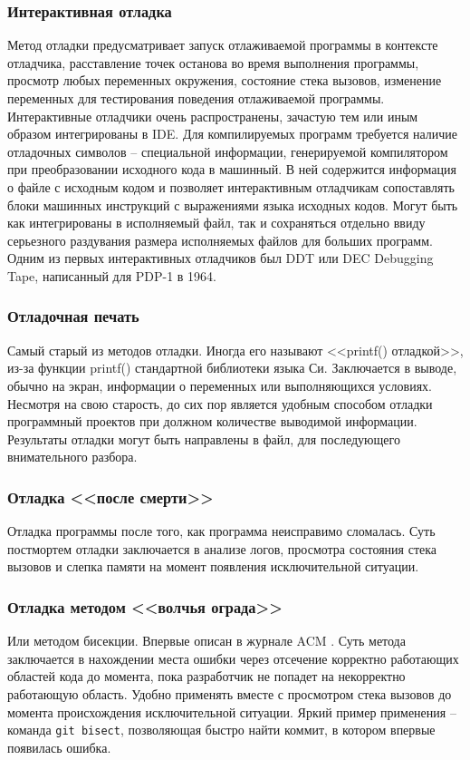 \subsubsection{Интерактивная отладка}\label{sec:ch2/sec1/sub3/sub1}
Метод отладки предусматривает запуск отлаживаемой программы в контексте
отладчика, расставление точек останова во время выполнения программы, просмотр
любых переменных окружения, состояние стека вызовов, изменение переменных
для тестирования поведения отлаживаемой программы.
Интерактивные отладчики очень распространены, зачастую тем или иным образом
интегрированы в IDE. Для компилируемых программ требуется наличие отладочных
символов -- специальной информации, генерируемой компилятором при 
преобразовании исходного кода в машинный. В ней содержится информация о 
файле с исходным кодом и позволяет интерактивным отладчикам сопоставлять
блоки машинных инструкций с выражениями языка исходных кодов. Могут
быть как интегрированы в исполняемый файл, так и сохраняться отдельно ввиду
серьезного раздувания размера исполняемых файлов для больших программ.
Одним из первых интерактивных отладчиков был DDT или DEC Debugging Tape,
написанный для PDP-1 в 1964.

\subsubsection{Отладочная печать}\label{sec:ch2/sec1/sub3/sub2}
Самый старый из методов отладки. Иногда его называют <<printf() отладкой>>, 
из-за функции printf() стандартной библиотеки языка Си. Заключается
в выводе, обычно на экран, информации о переменных или выполняющихся
условиях. Несмотря на свою старость, до сих пор является удобным способом 
отладки программный проектов при должном количестве выводимой информации.
Результаты отладки могут быть направлены в файл, для последующего внимательного
разбора.

\subsubsection{Отладка <<после смерти>>}\label{sec:ch2/sec1/sub3/sub3}
Отладка программы после того, как программа неисправимо сломалась.
Суть постмортем отладки заключается в анализе логов, просмотра состояния
стека вызовов и слепка памяти на момент появления исключительной ситуации.

\subsubsection{Отладка методом <<волчья ограда>>}\label{sec:ch2/sec1/sub3/sub4}
Или методом бисекции. Впервые описан в журнале ACM \autocite{wolf-fence}. 
Суть метода заключается в нахождении места ошибки через отсечение корректно
работающих областей кода до момента, пока разработчик не попадет на некорректно
работающую область. Удобно применять вместе с просмотром стека вызовов до момента
происхождения исключительной ситуации. Яркий пример применения -- команда
\verb|git bisect|, позволяющая быстро найти коммит, в котором впервые
появилась ошибка.

